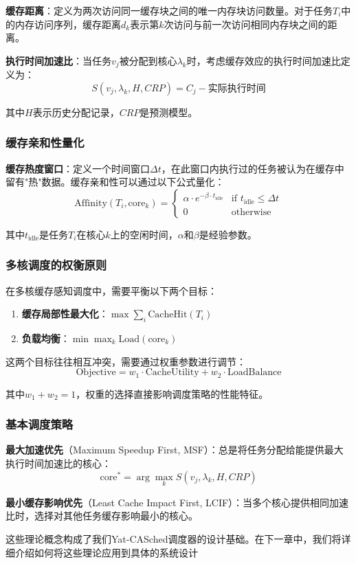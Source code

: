 \textbf{缓存距离}：定义为两次访问同一缓存块之间的唯一内存块访问数量。对于任务$T_i$中的内存访问序列，缓存距离$d_k$表示第$k$次访问与前一次访问相同内存块之间的距离。\cite{r7_Minimizing_cache_usage}

\textbf{执行时间加速比}：当任务$v_j$被分配到核心$\lambda_k$时，考虑缓存效应的执行时间加速比定义为：
$$S(v_j, \lambda_k, H, CRP) = C_j - \text{实际执行时间}$$

其中$H$表示历史分配记录，$CRP$是预测模型。

\subsubsection{缓存亲和性量化}

\textbf{缓存热度窗口}：定义一个时间窗口$\Delta t$，在此窗口内执行过的任务被认为在缓存中留有"热"数据。缓存亲和性可以通过以下公式量化：
$$\text{Affinity}(T_i, \text{core}_k) = \begin{cases}
\alpha \cdot e^{-\beta \cdot t_{\text{idle}}} & \text{if } t_{\text{idle}} \leq \Delta t \\
0 & \text{otherwise}
\end{cases}$$

其中$t_{\text{idle}}$是任务$T_i$在核心$k$上的空闲时间，$\alpha$和$\beta$是经验参数。

\subsubsection{多核调度的权衡原则}

在多核缓存感知调度中，需要平衡以下两个目标：

\begin{enumerate}
    \item \textbf{缓存局部性最大化}：$\max \sum_{i} \text{CacheHit}(T_i)$
    \item \textbf{负载均衡}：$\min \max_k \text{Load}(\text{core}_k)$
\end{enumerate}

这两个目标往往相互冲突，需要通过权重参数进行调节：
$$\text{Objective} = w_1 \cdot \text{CacheUtility} + w_2 \cdot \text{LoadBalance}$$

其中$w_1 + w_2 = 1$，权重的选择直接影响调度策略的性能特征。

\subsubsection{基本调度策略}

\textbf{最大加速优先}（Maximum Speedup First, MSF）：总是将任务分配给能提供最大执行时间加速比的核心：
$$\text{core}^* = \arg\max_k S(v_j, \lambda_k, H, CRP)$$

\textbf{最小缓存影响优先}（Least Cache Impact First, LCIF）：当多个核心提供相同加速比时，选择对其他任务缓存影响最小的核心。

这些理论概念构成了我们Yat-CASched调度器的设计基础。在下一章中，我们将详细介绍如何将这些理论应用到具体的系统设计